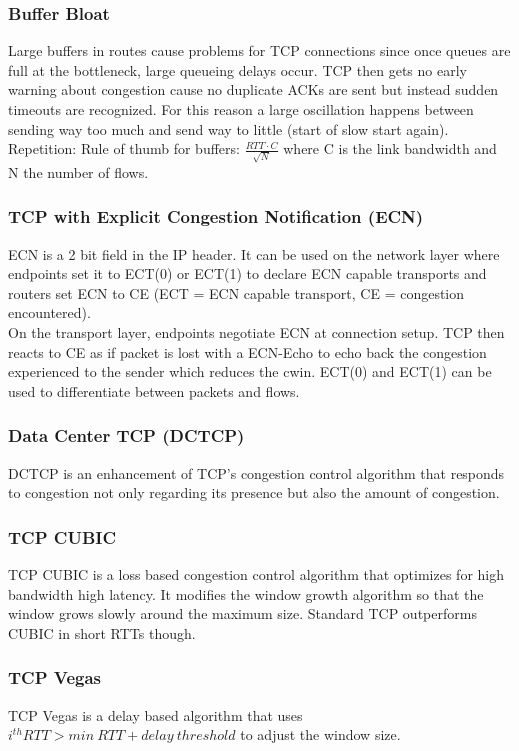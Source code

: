 \subsubsection*{Buffer Bloat}
Large buffers in routes cause problems for TCP connections since once queues are full at the bottleneck, large queueing delays occur.
TCP then gets no early warning about congestion cause no duplicate ACKs are sent but instead sudden timeouts are recognized.
For this reason a large oscillation happens between sending way too much and send way to little (start of slow start again).
Repetition: Rule of thumb for buffers: $\frac{RTT \cdot C}{\sqrt{N}}$ where C is the link bandwidth and N the number of flows.

\subsubsection*{TCP with Explicit Congestion Notification (ECN)}
ECN is a 2 bit field in the IP header.
It can be used on the network layer where endpoints set it to ECT(0) or ECT(1) to declare ECN capable transports and routers set ECN to CE (ECT = ECN capable transport, CE = congestion encountered).\\
On the transport layer, endpoints negotiate ECN at connection setup.
TCP then reacts to CE as if packet is lost with a ECN-Echo to echo back the congestion experienced to the sender which reduces the cwin.
ECT(0) and ECT(1) can be used to differentiate between packets and flows.

\subsubsection*{Data Center TCP (DCTCP)}
DCTCP is an enhancement of TCP's congestion control algorithm that responds to congestion not only regarding its presence but also the amount of congestion.

\subsubsection*{TCP CUBIC}
TCP CUBIC is a loss based congestion control algorithm that optimizes for high bandwidth high latency.
It modifies the window growth algorithm so that the window grows slowly around the maximum size.
Standard TCP outperforms CUBIC in short RTTs though.

\subsubsection*{TCP Vegas}
TCP Vegas is a delay based algorithm that uses $i^{th} RTT > min~RTT + delay~threshold$ to adjust the window size.

